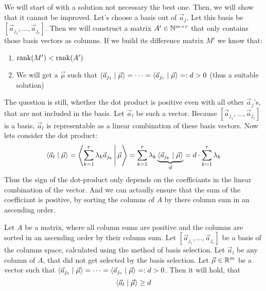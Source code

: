 We will start of with a solution not necessary the best one. Then, we will show that it cannot be improved. Let's choose a basis out of $\vec a_j$. Let this basis be $[\vec a_{j_1}, \dots, \vec a_{j_r}]$. Then we will construct a matrix $A' \in \mathbb{N}^{m \times r}$ that only contains those basis vectors as columns. If we build its difference matrix $M'$ we know that:
\begin{enumerate}
    \item $\operatorname{rank}(M') < \operatorname{rank}(A')$
    \item We will get a $\vec\mu$ such that $\langle \vec a_{j_1} \mid \vec\mu \rangle = \dots = \langle \vec a_{j_r} \mid \vec\mu \rangle =: d > 0$ (thus a suitable solution)
\end{enumerate}
The question is still, whether the dot product is positive even with all other $\vec a_j$'s, that are not included in the basis. Let $\vec a_l$ be such a vector. Because $[\vec a_{j_1}, \dots, \vec a_{j_r}]$ is a basis, $\vec a_l$ is representable as a linear combination of these basis vectors. Now lets consider the dot product:
$$\langle \vec a_l \mid \vec\mu \rangle = \left\langle \sum_{k=1}^{r}\lambda_k \vec a_{j_k} \,\middle|\, \vec\mu \right\rangle = \sum_{k=1}^{r}\lambda_k \underbrace{\langle \vec a_{j_k} \mid \vec\mu \rangle}_d = d\cdot \sum_{k=1}^{r}\lambda_k$$
Thus the sign of the dot-product only depends on the coefficiants in the linear combination of the vector. And we can actaully ensure that the sum of the coefficiant is positive, by sorting the columns of $A$ by there column sum in an ascending order. 
\begin{lemma}
    Let $A$ be a matrix, where all column sums are positive and the columns are sorted in an ascending order by their column sum. Let $[\vec a_{j_1}, \dots, \vec a_{j_r}]$ be a basis of the columns space, calculated using the method of basis selection. Let $\vec a_l$ be any column of $A$, that did not get selected by the basis selection. Let $\vec\mu \in \mathbb{R}^m$ be a vector such that $\langle \vec a_{j_1} \mid \vec\mu \rangle = \dots = \langle \vec a_{j_r} \mid \vec\mu \rangle =: d > 0$. Then it will hold, that 
    $$\langle \vec a_l \mid \vec\mu \rangle \geq d$$
\end{lemma}
